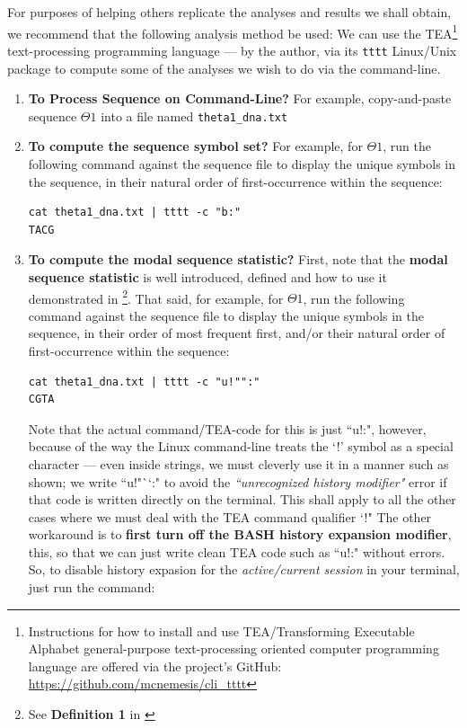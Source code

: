\documentclass[a4paper, 18pt]{book} %
\begin{document}
For purposes of helping others replicate the analyses and results we shall obtain, we recommend that the following analysis method be used: We can use the TEA\footnote{Instructions for how to install and use TEA/Transforming Executable Alphabet general-purpose text-processing oriented computer programming language are offered via the project's GitHub: \url{https://github.com/mcnemesis/cli_tttt}}\cite{Lutalo2024_taz}\cite{cli_tttt} text-processing programming language --- by the author, via its \texttt{tttt} Linux/Unix package to compute some of the analyses we wish to do via the command-line.

\begin{enumerate}
\item {\textbf{To Process Sequence on Command-Line?} For example, copy-and-paste sequence $\Theta1$ into a file named \texttt{theta1\_dna.txt}}
\item {\textbf{To compute the sequence symbol set?} For example, for $\Theta1$, run the following command against the sequence file to display the unique symbols in the sequence, in their natural order of first-occurrence within the sequence:

\begin{verbatim}
cat theta1_dna.txt | tttt -c "b:"
TACG
\end{verbatim}

}
\item {\textbf{To compute the modal sequence statistic?} First, note that the \textbf{modal sequence statistic} is well introduced, defined and how to use it demonstrated in \cite{transformatics}\footnote{See \textbf{Definition 1} in \cite{transformatics}}. That said, for example, for $\Theta1$, run the following command against the sequence file to display the unique symbols in the sequence, in their order of most frequent first, and/or their natural order of first-occurrence within the sequence:

\begin{verbatim}
cat theta1_dna.txt | tttt -c "u!"":"
CGTA
\end{verbatim}
Note that the actual command/TEA-code for this is just ``u!:", however, because of the way the Linux command-line treats the `!' symbol as a special character --- even inside strings, we must cleverly use it in a manner such as shown; we write ``u!"``:" to avoid the \textit{``unrecognized history modifier"} error if that code is written directly on the terminal. This shall apply to all the other cases where we must deal with the TEA command qualifier `!"\cite{Lutalo2024_taz} The other workaround is to \textbf{first turn off the BASH history expansion modifier}, this, so that we can just write clean TEA code such as ``u!:" without errors. So, to disable history expasion for the \textit{active/current session} in your terminal, just run the command:

}
\end{enumerate}
\end{document}
